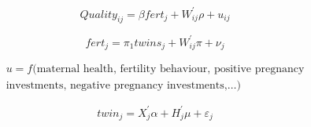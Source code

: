 
\begin{equation}
\label{TWINeqn:secondstage}
Quality_{ij}=\beta fert_{j} + W_{ij}^\prime\rho+u_{ij}
\end{equation}

\begin{equation}
\label{TWINeqn:firststage}
fert_{j}=\pi_1 twins_{j}+W_{ij}^\prime\pi+\nu_{j}
\end{equation}




\begin{equation}
\label{TWINeqn:IVbias}
\begin{split}
u=f(\text{maternal health, fertility behaviour, positive pregnancy}  \\
\text{investments, negative pregnancy investments,}\ldots)
\end{split}
\end{equation}


\begin{equation}
\label{TWINeqn:twinref}
twin_{j}=X_j^\prime\alpha + H_j^\prime\mu +\varepsilon_{j}
\end{equation}

